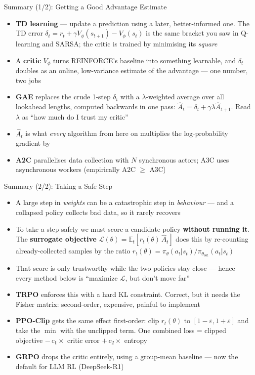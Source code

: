 \begin{frame}{Summary (1/2): Getting a Good Advantage Estimate}
\begin{itemize}
    \item \textbf{TD learning} --- update a prediction using a later, better-informed one. The TD error $\delta_t = r_t + \gamma V_\phi(s_{t+1}) - V_\phi(s_t)$ is the same bracket you saw in Q-learning and SARSA; the critic is trained by minimising its \emph{square}
    \item A \textbf{critic} $V_\phi$ turns REINFORCE's baseline into something learnable, and $\delta_t$ doubles as an online, low-variance estimate of the advantage --- one number, two jobs
    \item \textbf{GAE} replaces the crude 1-step $\delta_t$ with a $\lambda$-weighted average over all lookahead lengths, computed backwards in one pass: $\hat{A}_t = \delta_t + \gamma\lambda \hat{A}_{t+1}$. Read $\lambda$ as ``how much do I trust my critic''
    \item $\hat{A}_t$ is what \emph{every} algorithm from here on multiplies the log-probability gradient by
    \item \textbf{A2C} parallelises data collection with $N$ synchronous actors; A3C uses asynchronous workers (empirically A2C $\geq$ A3C)
\end{itemize}
\end{frame}

\begin{frame}{Summary (2/2): Taking a Safe Step}
\begin{itemize}
    \item A large step in \emph{weights} can be a catastrophic step in \emph{behaviour} --- and a collapsed policy collects bad data, so it rarely recovers
    \item To take a step safely we must score a candidate policy \textbf{without running it}. The \textbf{surrogate objective} $\mathcal{L}(\theta) = \mathbb{E}_t[r_t(\theta)\,\hat{A}_t]$ does this by re-counting already-collected samples by the ratio $r_t(\theta) = \pi_\theta(a_t|s_t)/\pi_{\theta_\text{old}}(a_t|s_t)$
    \item That score is only trustworthy while the two policies stay close --- hence every method below is ``maximize $\mathcal{L}$, but don't move far''
    \item \textbf{TRPO} enforces this with a hard KL constraint. Correct, but it needs the Fisher matrix: second-order, expensive, painful to implement
    \item \textbf{PPO-Clip} gets the same effect first-order: clip $r_t(\theta)$ to $[1{-}\varepsilon, 1{+}\varepsilon]$ and take the $\min$ with the unclipped term. One combined loss = clipped objective $-\,c_1\times$ critic error $+\,c_2\times$ entropy
    \item \textbf{GRPO} drops the critic entirely, using a group-mean baseline --- now the default for LLM RL (DeepSeek-R1)
\end{itemize}
\end{frame}

